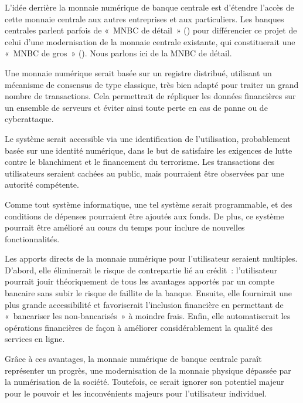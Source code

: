 L'idée derrière la monnaie numérique de banque centrale est d'étendre l'accès de cette monnaie centrale aux autres entreprises et aux particuliers. Les banques centrales parlent parfois de «~MNBC de détail~» () pour différencier ce projet de celui d'une modernisation de la monnaie centrale existante, qui constituerait une «~MNBC de gros~» (). Nous parlons ici de la MNBC de détail.


Une monnaie numérique serait basée sur un registre distribué, utilisant un mécanisme de consensus de type classique, très bien adapté pour traiter un grand nombre de transactions. Cela permettrait de répliquer les données financières sur un ensemble de serveurs et éviter ainsi toute perte en cas de panne ou de cyberattaque.

Le système serait accessible via une identification de l'utilisation, probablement basée sur une identité numérique, dans le but de satisfaire les exigences de lutte contre le blanchiment et le financement du terrorisme. Les transactions des utilisateurs seraient cachées au public, mais pourraient être observées par une autorité compétente.

Comme tout système informatique, une tel système serait programmable, et des conditions de dépenses pourraient être ajoutés aux fonds. De plus, ce système pourrait être amélioré au cours du temps pour inclure de nouvelles fonctionnalités.

Les apports directs de la monnaie numérique pour l'utilisateur seraient multiples. D'abord, elle éliminerait le risque de contrepartie lié au crédit~: l'utilisateur pourrait jouir théoriquement de tous les avantages apportés par un compte bancaire sans subir le risque de faillite de la banque. Ensuite, elle fournirait une plus grande accessibilité et favoriserait l'inclusion financière en permettant de «~bancariser les non-bancarisés~» à moindre frais. Enfin, elle automatiserait les opérations financières de façon à améliorer considérablement la qualité des services en ligne.

Grâce à ces avantages, la monnaie numérique de banque centrale paraît représenter un progrès, une modernisation de la monnaie physique dépassée par la numérisation de la société. Toutefois, ce serait ignorer son potentiel majeur pour le pouvoir et les inconvénients majeurs pour l'utilisateur individuel.


